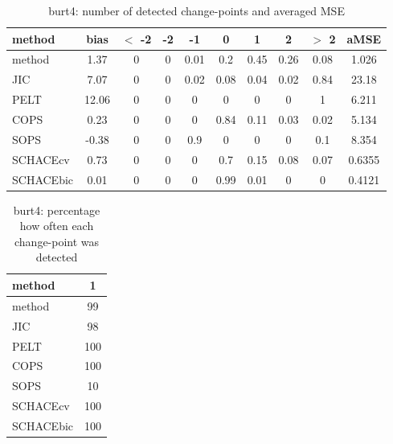 \begin{table}[ht]
\centering
\begin{tabular}{l|c|ccccccc|c}
  \hline
method & bias & $<$ -2 & -2 & -1 & 0 & 1 & 2 & $>$ 2 & aMSE \\ 
  \hline
method &  1.37 &     0 &     0 &  0.01 &   0.2 &  0.45 &  0.26 &  0.08 & 1.026 \\ 
  JIC &  7.07 &     0 &     0 &  0.02 &  0.08 &  0.04 &  0.02 &  0.84 & 23.18 \\ 
  PELT & 12.06 &     0 &     0 &     0 &     0 &     0 &     0 &     1 & 6.211 \\ 
  COPS &  0.23 &     0 &     0 &     0 &  0.84 &  0.11 &  0.03 &  0.02 & 5.134 \\ 
  SOPS & -0.38 &     0 &     0 &   0.9 &     0 &     0 &     0 &   0.1 & 8.354 \\ 
  SCHACEcv &  0.73 &     0 &     0 &     0 &   0.7 &  0.15 &  0.08 &  0.07 & 0.6355 \\ 
  SCHACEbic &  0.01 &     0 &     0 &     0 &  0.99 &  0.01 &     0 &     0 & 0.4121 \\ 
   \hline
\end{tabular}
\caption{burt4: number of detected change-points and averaged MSE} 
\label{tab:burt4Njumps}
\end{table}
\begin{table}[ht]
\centering
\begin{tabular}{l|c}
  \hline
method & 1 \\ 
  \hline
method &     99 \\ 
  JIC &     98 \\ 
  PELT &    100 \\ 
  COPS &    100 \\ 
  SOPS &     10 \\ 
  SCHACEcv &    100 \\ 
  SCHACEbic &    100 \\ 
   \hline
\end{tabular}
\caption{burt4: percentage how often each change-point was detected} 
\label{tab:burt4Detections}
\end{table}
